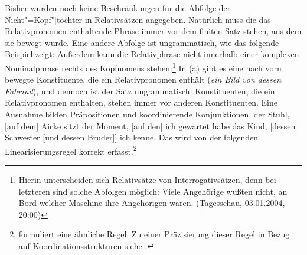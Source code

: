 Bisher wurden noch keine Beschränkungen
für die Abfolge der Nicht"=Kopf"|töchter in Relativsätzen angegeben. Natürlich muss die das
Relativpronomen enthaltende Phrase immer vor dem finiten Satz stehen, aus dem sie bewegt wurde. Eine
andere Abfolge ist ungrammatisch, wie das folgende Beispiel zeigt:
\z
\largerpage
Außerdem kann die Relativphrase nicht innerhalb einer komplexen
Nominalphrase rechts des Kopfnomens stehen:\footnote{
  Hierin unterscheiden sich Relativsätze von Interrogativsätzen,
  denn bei letzteren sind solche Abfolgen möglich:
\ea
Viele Angehörige wußten nicht, an Bord welcher Maschine ihre Angehörigen waren.
  (Tagesschau, 03.01.2004, 20:00)
\z
}
\eal
{}
\zl
In (a) gibt es eine nach vorn bewegte Konstituente, die ein Relativpronomen enthält 
(\emph{ein Bild von dessen Fahrrad}), und dennoch ist der Satz ungrammatisch.
Konstituenten, die ein Relativpronomen enthalten, stehen immer vor anderen Konstituenten.
Eine Ausnahme bilden Präpositionen 
und koordinierende Konjunktionen.
\eal
\ex der Stuhl, [auf dem] Aicke sitzt
\ex der Moment, [auf den] ich gewartet habe
\zl
\ea
das Kind, [dessen Schwester [und dessen Bruder]] ich kenne,
\z
Das wird von der folgenden Linearisierungsregel korrekt erfasst.\footnote{
        \citet*{Riemsdijk85} 
        formuliert eine ähnliche Regel. Zu einer Präzisierung dieser
        Regel in Bezug auf Koordinationsstrukturen siehe .%
}
